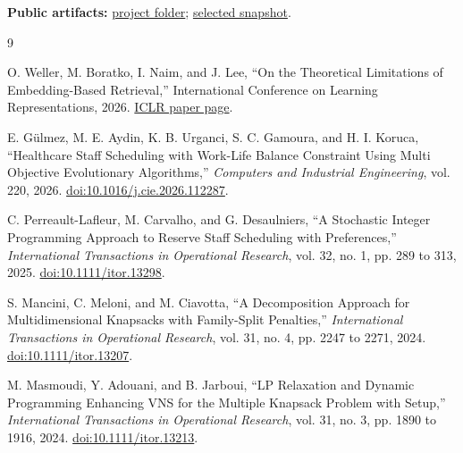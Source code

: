 \documentclass[10pt]{article}
\newcommand{\artifact}[2]{\href{#1}{#2}}
\begin{document}
\vspace{0.05em}
{\footnotesize\textbf{Public artifacts:}
\artifact{https://github.com/mutingma123/OpenProjects/tree/main/StochasticMultipleKnapsack}{project folder};
\artifact{https://github.com/mutingma123/OpenProjects/tree/main/StochasticMultipleKnapsack/Figures}{selected snapshot}.\par}

\clearpage
{}
{}
\begin{thebibliography}{9}
\small

\fin O. Weller, M. Boratko, I. Naim, and J. Lee, ``On the Theoretical Limitations of Embedding-Based Retrieval,'' International Conference on Learning Representations, 2026. \fine
\href{https://openreview.net/forum?id=vNEY32I8Y8}{ICLR paper page}.

\fin E. G\"ulmez, M. E. Aydin, K. B. Urganci, S. C. Gamoura, and H. I. Koruca, ``Healthcare Staff Scheduling with Work-Life Balance Constraint Using Multi Objective Evolutionary Algorithms,'' \textit{Computers and Industrial Engineering}, vol. 220, 2026. \fine
\href{https://doi.org/10.1016/j.cie.2026.112287}{doi:10.1016/j.cie.2026.112287}.

\fin C. Perreault-Lafleur, M. Carvalho, and G. Desaulniers, ``A Stochastic Integer Programming Approach to Reserve Staff Scheduling with Preferences,'' \textit{International Transactions in Operational Research}, vol. 32, no. 1, pp. 289 to 313, 2025. \fine
\href{https://doi.org/10.1111/itor.13298}{doi:10.1111/itor.13298}.

\fin S. Mancini, C. Meloni, and M. Ciavotta, ``A Decomposition Approach for Multidimensional Knapsacks with Family-Split Penalties,'' \textit{International Transactions in Operational Research}, vol. 31, no. 4, pp. 2247 to 2271, 2024. \fine
\href{https://doi.org/10.1111/itor.13207}{doi:10.1111/itor.13207}.

\fin M. Masmoudi, Y. Adouani, and B. Jarboui, ``LP Relaxation and Dynamic Programming Enhancing VNS for the Multiple Knapsack Problem with Setup,'' \textit{International Transactions in Operational Research}, vol. 31, no. 3, pp. 1890 to 1916, 2024. \fine
\href{https://doi.org/10.1111/itor.13213}{doi:10.1111/itor.13213}.

\end{thebibliography}
\end{document}
